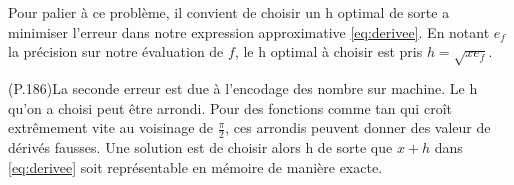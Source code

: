 \documentclass{article}
\begin{document}
Pour palier à ce problème, il convient de choisir un h optimal de sorte a minimiser l'erreur dans notre expression approximative \ref{eq:derivee}. En notant $e_f$ la précision sur notre évaluation de $f$, le h optimal à choisir est pris $h = \sqrt{xe_f}$.
\newline

(P.186)La seconde erreur est due à l'encodage des nombre sur machine. Le h qu'on a choisi peut être arrondi. Pour des fonctions comme tan qui croît extrêmement vite au voisinage de $\frac{\pi}{2}$, ces arrondis peuvent donner des valeur de dérivés fausses. Une solution est de choisir alors h de sorte que $x+h$ dans \ref{eq:derivee} soit représentable en mémoire de manière exacte.
\end{document}
